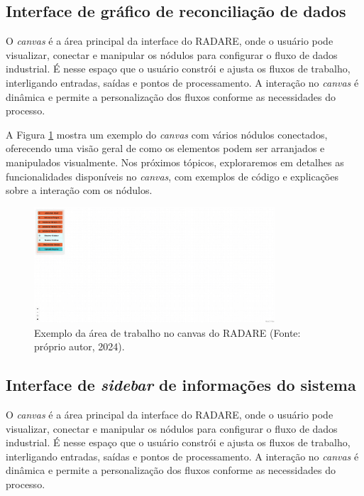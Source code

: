 \subsection{Interface de gráfico de reconciliação de dados}

O \textit{canvas} é a área principal da interface do RADARE, onde o usuário pode visualizar, conectar e manipular os nódulos para configurar o fluxo de dados industrial. É nesse espaço que o usuário constrói e ajusta os fluxos de trabalho, interligando entradas, saídas e pontos de processamento. A interação no \textit{canvas} é dinâmica e permite a personalização dos fluxos conforme as necessidades do processo.

A Figura \ref{Fig:CanvasArea} mostra um exemplo do \textit{canvas} com vários nódulos conectados, oferecendo uma visão geral de como os elementos podem ser arranjados e manipulados visualmente. Nos próximos tópicos, exploraremos em detalhes as funcionalidades disponíveis no \textit{canvas}, com exemplos de código e explicações sobre a interação com os nódulos.

\begin{figure}[htbp]
    \centering
    \includegraphics[width=0.8\textwidth]{figuras/empty-canvas.png}
    \caption{Exemplo da área de trabalho no canvas do RADARE (Fonte: próprio autor, 2024).}
    \label{Fig:CanvasArea}
\end{figure}


\subsection{Interface de \textit{sidebar} de informações do sistema}

O \textit{canvas} é a área principal da interface do RADARE, onde o usuário pode visualizar, conectar e manipular os nódulos para configurar o fluxo de dados industrial. É nesse espaço que o usuário constrói e ajusta os fluxos de trabalho, interligando entradas, saídas e pontos de processamento. A interação no \textit{canvas} é dinâmica e permite a personalização dos fluxos conforme as necessidades do processo.

